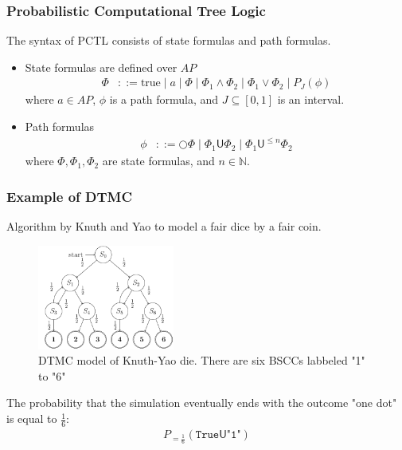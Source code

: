 \documentclass{beamer}
\begin{document}
\begin{frame}
    \frametitle{Probabilistic Computational Tree Logic}
    \footnotesize{
        \begin{definition}
            \rm
            The syntax of PCTL consists of state formulas and path formulas.
            \begin{itemize}
                \item State formulas are defined over $AP$
                      \begin{align*}
                          \Phi & ::= \text{true} \;|\; a \;|\; \Phi \;|\; \Phi_1 \wedge \Phi_2 \;|\; \Phi_1 \vee \Phi_2 \;|\;  P_{J}(\phi)
                      \end{align*}
                      where $a\in AP$, $\phi$ is a path formula, and $J\subseteq[0,1]$ is an interval.
                \item Path formulas
                      \begin{align*}
                          \phi & ::= \bigcirc \Phi \;|\; \Phi_1 \mathsf{U} \Phi_2 \;|\; \Phi_1 \mathsf{U}^{\leq n} \Phi_2
                      \end{align*}
                      where $\Phi,\Phi_1,\Phi_2$ are state formulas, and $n\in \mathbb{N}$.
            \end{itemize}
        \end{definition}
    }
\end{frame}

\begin{frame}
    \frametitle{Example of DTMC}
    Algorithm by Knuth and Yao \cite{knuth1976complexity} to model a fair dice by a fair coin.
    \begin{figure}[H]
        \centering
        \includegraphics[width=0.4\textwidth]{figures/knuth_die_dtmc.png}
        \caption{DTMC model of Knuth-Yao die. There are six BSCCs labbeled "1" to "6"}
    \end{figure}
    The probability that the simulation eventually ends with the outcome "one dot" is equal to
    $\frac{1}{6}$:
    \begin{align*}
        P_{=\frac{1}{6}}(\texttt{True} \mathsf{U} \texttt{"1"})
    \end{align*}
\end{frame}
\end{document}
